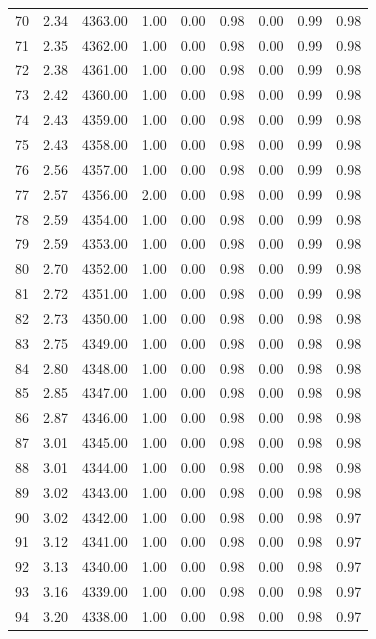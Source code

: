 \documentclass{article}\usepackage[]{graphicx}\usepackage[]{color}
\begin{document}
\begin{longtable}{rrrrrrrrr}
  70 & 2.34 & 4363.00 & 1.00 & 0.00 & 0.98 & 0.00 & 0.99 & 0.98 \\ 
  71 & 2.35 & 4362.00 & 1.00 & 0.00 & 0.98 & 0.00 & 0.99 & 0.98 \\ 
  72 & 2.38 & 4361.00 & 1.00 & 0.00 & 0.98 & 0.00 & 0.99 & 0.98 \\ 
  73 & 2.42 & 4360.00 & 1.00 & 0.00 & 0.98 & 0.00 & 0.99 & 0.98 \\ 
  74 & 2.43 & 4359.00 & 1.00 & 0.00 & 0.98 & 0.00 & 0.99 & 0.98 \\ 
  75 & 2.43 & 4358.00 & 1.00 & 0.00 & 0.98 & 0.00 & 0.99 & 0.98 \\ 
  76 & 2.56 & 4357.00 & 1.00 & 0.00 & 0.98 & 0.00 & 0.99 & 0.98 \\ 
  77 & 2.57 & 4356.00 & 2.00 & 0.00 & 0.98 & 0.00 & 0.99 & 0.98 \\ 
  78 & 2.59 & 4354.00 & 1.00 & 0.00 & 0.98 & 0.00 & 0.99 & 0.98 \\ 
  79 & 2.59 & 4353.00 & 1.00 & 0.00 & 0.98 & 0.00 & 0.99 & 0.98 \\ 
  80 & 2.70 & 4352.00 & 1.00 & 0.00 & 0.98 & 0.00 & 0.99 & 0.98 \\ 
  81 & 2.72 & 4351.00 & 1.00 & 0.00 & 0.98 & 0.00 & 0.99 & 0.98 \\ 
  82 & 2.73 & 4350.00 & 1.00 & 0.00 & 0.98 & 0.00 & 0.98 & 0.98 \\ 
  83 & 2.75 & 4349.00 & 1.00 & 0.00 & 0.98 & 0.00 & 0.98 & 0.98 \\ 
  84 & 2.80 & 4348.00 & 1.00 & 0.00 & 0.98 & 0.00 & 0.98 & 0.98 \\ 
  85 & 2.85 & 4347.00 & 1.00 & 0.00 & 0.98 & 0.00 & 0.98 & 0.98 \\ 
  86 & 2.87 & 4346.00 & 1.00 & 0.00 & 0.98 & 0.00 & 0.98 & 0.98 \\ 
  87 & 3.01 & 4345.00 & 1.00 & 0.00 & 0.98 & 0.00 & 0.98 & 0.98 \\ 
  88 & 3.01 & 4344.00 & 1.00 & 0.00 & 0.98 & 0.00 & 0.98 & 0.98 \\ 
  89 & 3.02 & 4343.00 & 1.00 & 0.00 & 0.98 & 0.00 & 0.98 & 0.98 \\ 
  90 & 3.02 & 4342.00 & 1.00 & 0.00 & 0.98 & 0.00 & 0.98 & 0.97 \\ 
  91 & 3.12 & 4341.00 & 1.00 & 0.00 & 0.98 & 0.00 & 0.98 & 0.97 \\ 
  92 & 3.13 & 4340.00 & 1.00 & 0.00 & 0.98 & 0.00 & 0.98 & 0.97 \\ 
  93 & 3.16 & 4339.00 & 1.00 & 0.00 & 0.98 & 0.00 & 0.98 & 0.97 \\ 
  94 & 3.20 & 4338.00 & 1.00 & 0.00 & 0.98 & 0.00 & 0.98 & 0.97 \\ 

\end{longtable}
\end{document}
